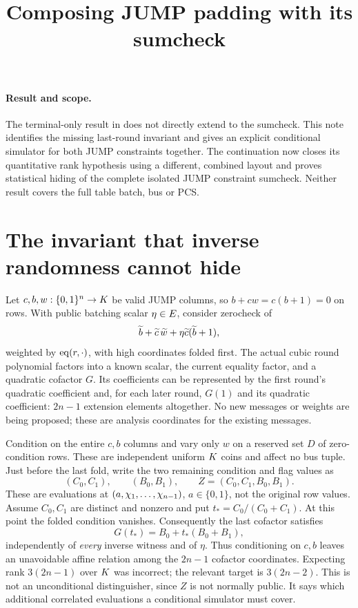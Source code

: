 \documentclass[11pt]{article}
\title{Composing JUMP padding with its sumcheck}
\author{}
\date{}
\begin{document}
\maketitle
\vspace{-2em}

\paragraph{Result and scope.} The terminal-only result in  does not directly extend to the sumcheck. This note identifies the missing last-round invariant and gives an explicit conditional simulator for both JUMP constraints together. The continuation  now closes its quantitative rank hypothesis using a different, combined layout and proves statistical hiding of the complete isolated JUMP constraint sumcheck. Neither result covers the full table batch, bus or PCS.

\section{The invariant that inverse randomness cannot hide}

Let $c,b,w:\{0,1\}^{n}\to K$ be valid JUMP columns, so $b+cw=c(b+1)=0$ on rows. With public batching scalar $\eta\in E$, consider zerocheck of
\[
 \widetilde{b}+\widetilde{c}\,\widetilde{w}+\eta\widetilde{c}(\widetilde{b}+1),
\]
weighted by $\operatorname{eq}(r,\cdot)$, with high coordinates folded first. The actual cubic round polynomial factors into a known scalar, the current equality factor, and a quadratic cofactor $G$. Its coefficients can be represented by the first round's quadratic coefficient and, for each later round, $G(1)$ and its quadratic coefficient: $2n-1$ extension elements altogether. No new messages or weights are being proposed; these are analysis coordinates for the existing messages.

Condition on the entire $c,b$ columns and vary only $w$ on a reserved set $D$ of zero-condition rows. These are independent uniform $K$ coins and affect no bus tuple. Just before the last fold, write the two remaining condition and flag values as
\[
 (C_0,C_1),\qquad (B_0,B_1),\qquad
 Z=(C_0,C_1,B_0,B_1).
\]
These are evaluations at $(a,\chi_1,\ldots,\chi_{n-1})$, $a\in\{0,1\}$, not the original row values. Assume $C_0,C_1$ are distinct and nonzero and put $t_*=C_0/(C_0+C_1)$. At this point the folded condition vanishes. Consequently the last cofactor satisfies
\begin{equation}\label{eq:jump-root}
 G(t_*)=B_0+t_*(B_0+B_1),
\end{equation}
independently of \emph{every} inverse witness and of $\eta$. Thus conditioning on $c,b$ leaves an unavoidable affine relation among the $2n-1$ cofactor coordinates. Expecting rank $3(2n-1)$ over $K$ was incorrect; the relevant target is $3(2n-2)$. This is not an unconditional distinguisher, since $Z$ is not normally public. It says which additional correlated evaluations a conditional simulator must cover.
\end{document}
